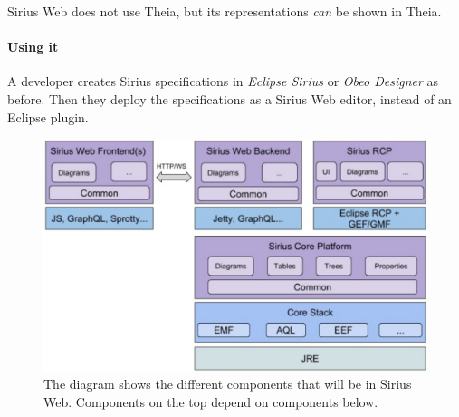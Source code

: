 Sirius Web does not use Theia, but its representations \textit{can} be shown in Theia.~\cite{neilmackenzieSiriusWebXText2020}

\paragraph*{Using it} A developer creates Sirius specifications in \emph{Eclipse Sirius} or \emph{Obeo Designer} as before. 
Then they deploy the specifications as a Sirius Web editor, instead of an Eclipse plugin.

\begin{figure}[htbp]  %
  \centering
  \includegraphics[width=\textwidth]{figures/Sirius-future-web-architecture}
  \caption[The Sirius Web Architecture]{The diagram shows the different components that will be in Sirius Web. Components on the top depend on components below.~\cite[p.~37]{davidSiriusCon2018Sirius2018}}\label{fig:sirius-web-architecture}
\end{figure}


